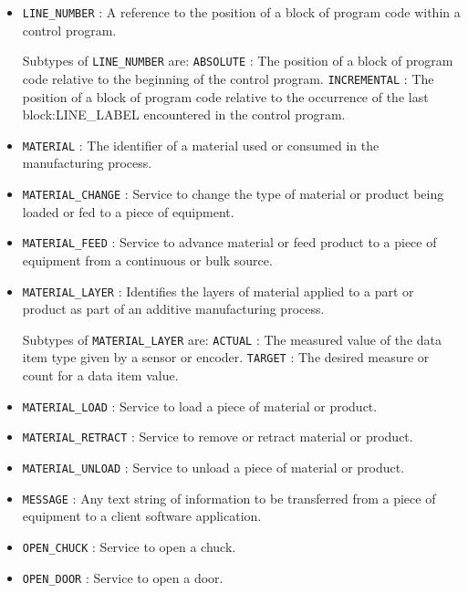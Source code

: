 \begin{itemize}
\item \texttt{LINE_NUMBER} : A reference to the position of a block of program code within a control program. 

Subtypes of \texttt{LINE_NUMBER} are: 
\newline\tab \texttt{ABSOLUTE} : The position of a block of program code relative to the beginning of the control program. 
\newline\tab \texttt{INCREMENTAL} : The position of a block of program code relative to the occurrence of the last {block:LINE_LABEL} encountered in the control program. 
\item \texttt{MATERIAL} : The identifier of a material used or consumed in the manufacturing process. 

\item \texttt{MATERIAL_CHANGE} : Service to change the type of material or product being loaded or fed to a piece of equipment. 

\item \texttt{MATERIAL_FEED} : Service to advance material or feed product to a piece of equipment from a continuous or bulk source. 

\item \texttt{MATERIAL_LAYER} : Identifies the layers of material applied to a part or product as part of an additive manufacturing process. 

Subtypes of \texttt{MATERIAL_LAYER} are: 
\newline\tab \texttt{ACTUAL} : The measured value of the data item type given by a sensor or encoder. 
\newline\tab \texttt{TARGET} : The desired measure or count for a data item value. 
\item \texttt{MATERIAL_LOAD} : Service to load a piece of material or product. 

\item \texttt{MATERIAL_RETRACT} : Service to remove or retract material or product. 

\item \texttt{MATERIAL_UNLOAD} : Service to unload a piece of material or product. 

\item \texttt{MESSAGE} : Any text string of information to be transferred from a piece of equipment to a client software application. 

\item \texttt{OPEN_CHUCK} : Service to open a chuck. 

\item \texttt{OPEN_DOOR} : Service to open a door. 


\end{itemize}
